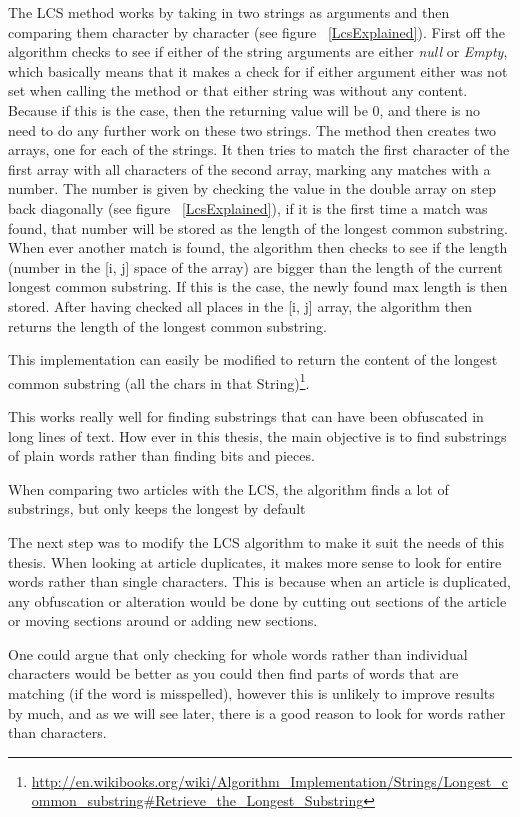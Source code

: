 The LCS method works by taking in two strings as arguments and then comparing them character by character (see figure ~\ref{LcsExplained}). First off the algorithm checks to see if either of the string arguments are either \textit{null} or \textit{Empty}, which basically means that it makes a check for if either argument either was not set when calling the method or that either string was without any content. Because if this is the case, then the returning value will be 0, and there is no need to do any further work on these two strings. The method then creates two arrays, one for each of the strings. It then tries to match the first character of the first array with all characters of the second array, marking any matches with a number. The number is given by checking the value in the double array on step back diagonally (see figure ~\ref{LcsExplained}), if it is the first time a match was found, that number will be stored as the length of the longest common substring. When ever another match is found, the algorithm then checks to see if the length (number in the [i, j] space of the array) are bigger than the length of the current longest common substring. If this is the case, the newly found max length is then stored. After having checked all places in the [i, j] array, the algorithm then returns the length of the longest common substring.

This implementation can easily be modified to return the content of the longest common substring (all the chars in that String)\footnote{\url{http://en.wikibooks.org/wiki/Algorithm_Implementation/Strings/Longest_common_substring\#Retrieve_the_Longest_Substring}}.

This works really well for finding substrings that can have been obfuscated in long lines of text. How ever in this thesis, the main objective is to find substrings of plain words rather than finding bits and pieces.

When comparing two articles with the LCS, the algorithm finds a lot of substrings, but only keeps the longest by default

The next step was to modify the LCS algorithm to make it suit the needs of this thesis. When looking at article duplicates, it makes more sense to look for entire words rather than single characters. This is because when an article is duplicated, any obfuscation or alteration would be done by cutting out sections of the article or moving sections around or adding new sections. 

One could argue that only checking for whole words rather than individual characters would be better as you could then find parts of words that are matching (if the word is misspelled), however this is unlikely to improve results by much, and as we will see later, there is a good reason to look for words rather than characters.

